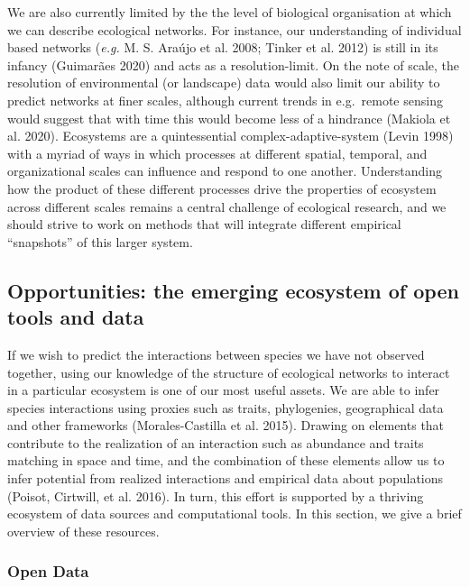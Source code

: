 \documentclass[11pt]{article}
\begin{document}
We are also currently limited by the the level of biological
organisation at which we can describe ecological networks. For instance,
our understanding of individual based networks (\emph{e.g.} M. S. Araújo
et al. 2008; Tinker et al. 2012) is still in its infancy (Guimarães
2020) and acts as a resolution-limit. On the note of scale, the
resolution of environmental (or landscape) data would also limit our
ability to predict networks at finer scales, although current trends in
e.g.~remote sensing would suggest that with time this would become less
of a hindrance (Makiola et al. 2020). Ecosystems are a quintessential
complex-adaptive-system (Levin 1998) with a myriad of ways in which
processes at different spatial, temporal, and organizational scales can
influence and respond to one another. Understanding how the product of
these different processes drive the properties of ecosystem across
different scales remains a central challenge of ecological research, and
we should strive to work on methods that will integrate different
empirical ``snapshots'' of this larger system.

\hypertarget{opportunities-the-emerging-ecosystem-of-open-tools-and-data}{%
\subsection{Opportunities: the emerging ecosystem of open tools and
data}\label{opportunities-the-emerging-ecosystem-of-open-tools-and-data}}

If we wish to predict the interactions between species we have not
observed together, using our knowledge of the structure of ecological
networks to interact in a particular ecosystem is one of our most useful
assets. We are able to infer species interactions using proxies such as
traits, phylogenies, geographical data and other frameworks
(Morales-Castilla et al. 2015). Drawing on elements that contribute to
the realization of an interaction such as abundance and traits matching
in space and time, and the combination of these elements allow us to
infer potential from realized interactions and empirical data about
populations (Poisot, Cirtwill, et al. 2016). In turn, this effort is
supported by a thriving ecosystem of data sources and computational
tools. In this section, we give a brief overview of these resources.

\hypertarget{open-data}{%
\subsubsection{Open Data}\label{open-data}}
\end{document}
